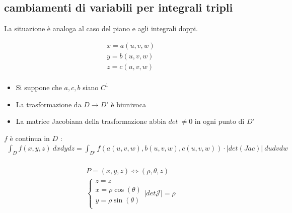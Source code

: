 \documentclass[a4paper, oneside]{article}
\def\potatoshape{
  (1,0) (2,1.5) (1.6,3) (0.3,2.7) (-0.4,1.2)
}
\newcommand{\potato}[3][draw=white]{
  \begin{scope}[shift={#2}, scale=#3]
    \draw[#1]
      plot [smooth cycle, tension=1]
      coordinates {\potatoshape};
  \end{scope}
}
\begin{document}
\subsection{cambiamenti di variabili per integrali tripli}
La situazione è analoga al caso del piano e agli integrali doppi.
\begin{center}
\end{center}
\begin{gather*}
  x = a(u,v,w) \\
  y = b(u,v,w) \\
  z = c(u,v,w) \\
\end{gather*}
\begin{itemize}
  \item Si suppone che $a,c,b$ siano $C^1$
  \item La trasformazione da $D \to D'$ è biunivoca
  \item La matrice Jacobiana della trasformazione abbia $det \ \neq 0$ in ogni punto di $D'$ 
\end{itemize}
 $f$ è continua in $D$ :
\begin{gather*}
  \int_D f(x,y,z) \ dxdydz = \int_{D'} f(a(u,v,w),b(u,v,w),c(u,v,w)) \cdot \left| det(Jac) \right| \ dudvdw \\
\end{gather*}
\newpage
\begin{definition}
  \begin{gather*}
    P = (x,y,z) \Leftrightarrow (\rho,\theta,z) \\
    \begin{cases}
      z = z\\
      x = \rho\cos(\theta) \\
      y = \rho\sin(\theta) \\
    \end{cases}
    \left| det \mathcal{J} \right| = \rho 
  \end{gather*}
\end{definition}
\end{document}
